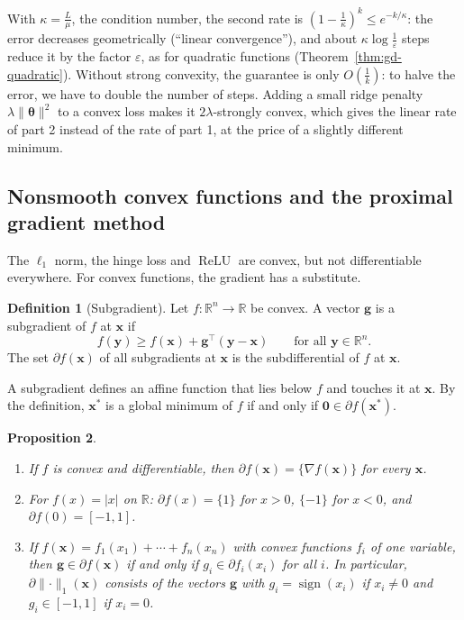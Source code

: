 \documentclass[11pt]{article}
\newcommand{\norm}[1]{\lVert #1 \rVert}
\theoremstyle{definition}
\newtheorem{definition}{Definition}[section]
\theoremstyle{plain}
\newtheorem{proposition}[definition]{Proposition}
\theoremstyle{remark}
\DeclareMathOperator{\sign}{sign}
\DeclareMathOperator{\ReLU}{ReLU}
\begin{document}
With $\kappa = \frac{L}{\mu}$, the condition number, the second rate is $(1 - \frac{1}{\kappa})^k \leq e^{-k/\kappa}$: the error decreases geometrically (``linear convergence''), and about $\kappa\log\frac{1}{\varepsilon}$ steps reduce it by the factor $\varepsilon$, as for quadratic functions (Theorem~\ref{thm:gd-quadratic}). Without strong convexity, the guarantee is only $O(\frac{1}{k})$: to halve the error, we have to double the number of steps. Adding a small ridge penalty $\lambda\norm{\boldsymbol{\theta}}^2$ to a convex loss makes it $2\lambda$-strongly convex, which gives the linear rate of part 2 instead of the rate of part 1, at the price of a slightly different minimum.

\subsection{Nonsmooth convex functions and the proximal gradient method}\label{sec:prox}

The $\ell_1$ norm, the hinge loss and $\ReLU$ are convex, but not differentiable everywhere. For convex functions, the gradient has a substitute.

\begin{definition}[Subgradient]\label{def:subgradient}
    Let $f: \mathbb{R}^n \to \mathbb{R}$ be convex. A vector $\mathbf{g}$ is a subgradient of $f$ at $\mathbf{x}$ if
    \[f(\mathbf{y}) \geq f(\mathbf{x}) + \mathbf{g}^\top(\mathbf{y} - \mathbf{x}) \qquad \text{for all } \mathbf{y} \in \mathbb{R}^n.\]
    The set $\partial f(\mathbf{x})$ of all subgradients at $\mathbf{x}$ is the subdifferential of $f$ at $\mathbf{x}$.
\end{definition}

A subgradient defines an affine function that lies below $f$ and touches it at $\mathbf{x}$. By the definition, $\mathbf{x}^*$ is a global minimum of $f$ if and only if $\mathbf{0} \in \partial f(\mathbf{x}^*)$.

\begin{proposition}\label{prop:subgradients}
    \begin{enumerate}
        \item If $f$ is convex and differentiable, then $\partial f(\mathbf{x}) = \{\nabla f(\mathbf{x})\}$ for every $\mathbf{x}$.
        \item For $f(x) = |x|$ on $\mathbb{R}$: $\partial f(x) = \{1\}$ for $x > 0$, $\{-1\}$ for $x < 0$, and $\partial f(0) = [-1, 1]$.
        \item If $f(\mathbf{x}) = f_1(x_1) + \cdots + f_n(x_n)$ with convex functions $f_i$ of one variable, then $\mathbf{g} \in \partial f(\mathbf{x})$ if and only if $g_i \in \partial f_i(x_i)$ for all $i$. In particular, $\partial\norm{\cdot}_1(\mathbf{x})$ consists of the vectors $\mathbf{g}$ with $g_i = \sign(x_i)$ if $x_i \neq 0$ and $g_i \in [-1, 1]$ if $x_i = 0$.
    \end{enumerate}
\end{proposition}
\end{document}
